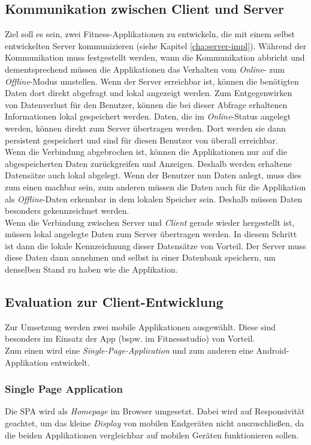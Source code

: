 \subsection{Kommunikation zwischen Client und Server}
\label{ssec:kommunikation-client-server}
Ziel soll es sein, zwei Fitness-Applikationen zu entwickeln, die mit einem selbst entwickelten Server kommunizieren (siehe Kapitel \ref{cha:server-impl}). Während der Kommunikation muss festgestellt werden, wann die Kommunikation abbricht und dementsprechend müssen die Applikationen das Verhalten vom \textit{Online}- zum \textit{Offline}-Modus umstellen. Wenn der Server erreichbar ist, können die benötigten Daten dort direkt abgefragt und lokal angezeigt werden. Zum Entgegenwirken von Datenverlust für den Benutzer, können die bei dieser Abfrage erhaltenen Informationen lokal gespeichert werden. Daten, die im \textit{Online}-Status angelegt werden, können direkt zum Server übertragen werden. Dort werden sie dann persistent gespeichert und sind für diesen Benutzer von überall erreichbar.\\
Wenn die Verbindung abgebrochen ist, können die Applikationen nur auf die abgespeicherten Daten zurückgreifen und Anzeigen. Deshalb werden erhaltene Datensätze auch lokal abgelegt. Wenn der Benutzer nun Daten anlegt, muss dies zum einen machbar sein, zum anderen müssen die Daten auch für die Applikation als \textit{Offline}-Daten erkennbar in dem lokalen Speicher sein. Deshalb müssen Daten besonders gekennzeichnet werden.\\
Wenn die Verbindung zwischen Server und \textit{Client} gerade wieder hergestellt ist, müssen lokal angelegte Daten zum Server übertragen werden. In diesem Schritt ist dann die lokale Kennzeichnung dieser Datensätze von Vorteil. Der Server muss diese Daten dann annehmen und selbst in einer Datenbank speichern, um denselben Stand zu haben wie die Applikation.
\subsection{Evaluation zur Client-Entwicklung}
\label{ssec:evaluation-client-entwicklung}
Zur Umsetzung werden zwei mobile Applikationen ausgewählt. Diese sind besonders im Einsatz der App (bspw. im Fitnessstudio) von Vorteil. \\
Zum einen wird eine \textit{Single-Page-Application} und zum anderen eine Android-Applikation entwickelt.
\subsubsection*{Single Page Application}
\label{ssec:aufgabenstellung:spa}
Die \ac{SPA} wird als \textit{Homepage} im Browser umgesetzt. Dabei wird auf Responsivität geachtet, um das kleine \textit{Display} von mobilen Endgeräten nicht auszuschließen, da die beiden Applikationen vergleichbar auf mobilen Geräten funktionieren sollen.
